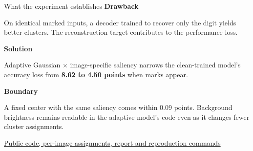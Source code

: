\documentclass[aspectratio=169,11pt]{beamer}
\newcommand{\key}[1]{{\color{blue}\bfseries #1}}
\newcommand{\notefoot}[1]{\par\vfill{\scriptsize\color{navy}#1}}
\begin{document}
\begin{frame}{What the experiment establishes}
\key{Drawback}\par
On identical marked inputs, a decoder trained to recover only the digit yields better clusters. The reconstruction target contributes to the performance loss.\par\medskip
\key{Solution}\par
Adaptive Gaussian $\times$ image-specific saliency narrows the clean-trained model's accuracy loss from \textbf{8.62 to 4.50 points} when marks appear.\par\medskip
\key{Boundary}\par
A fixed center with the same saliency comes within 0.09 points. Background brightness remains readable in the adaptive model's code even as it changes fewer cluster assignments.
\notefoot{\href{https://github.com/JohnR31N/cs126FinalProj/tree/idec-final-v2.2}{Public code, per-image assignments, report and reproduction commands}}
\end{frame}
\end{document}
